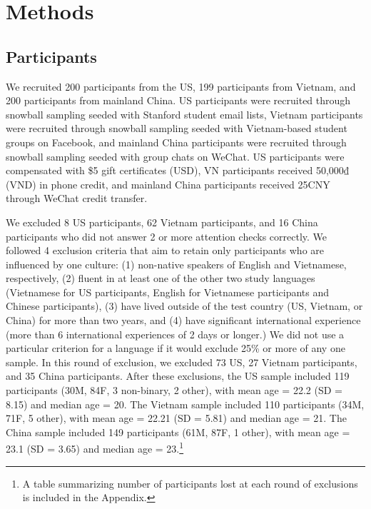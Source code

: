 \documentclass[10pt, letterpaper]{article}
\begin{document}
\hypertarget{methods}{%
\section{Methods}\label{methods}}

\hypertarget{participants}{%
\subsection{Participants}\label{participants}}

We recruited 200 participants from the US, 199 participants from
Vietnam, and 200 participants from mainland China. US participants were
recruited through snowball sampling seeded with Stanford student email
lists, Vietnam participants were recruited through snowball sampling
seeded with Vietnam-based student groups on Facebook, and mainland China
participants were recruited through snowball sampling seeded with group
chats on WeChat. US participants were compensated with \$5 gift
certificates (USD), VN participants received 50,000₫ (VND) in phone
credit, and mainland China participants received 25CNY through WeChat
credit transfer.

We excluded 8 US participants, 62 Vietnam participants, and 16 China
participants who did not answer 2 or more attention checks correctly. We
followed 4 exclusion criteria that aim to retain only participants who
are influenced by one culture: (1) non-native speakers of English and
Vietnamese, respectively, (2) fluent in at least one of the other two
study languages (Vietnamese for US participants, English for Vietnamese
participants and Chinese participants), (3) have lived outside of the
test country (US, Vietnam, or China) for more than two years, and (4)
have significant international experience (more than 6 international
experiences of 2 days or longer.) We did not use a particular criterion
for a language if it would exclude 25\% or more of any one sample. In
this round of exclusion, we excluded 73 US, 27 Vietnam participants, and
35 China participants. After these exclusions, the US sample included
119 participants (30M, 84F, 3 non-binary, 2 other), with mean age = 22.2
(SD = 8.15) and median age = 20. The Vietnam sample included 110
participants (34M, 71F, 5 other), with mean age = 22.21 (SD = 5.81) and
median age = 21. The China sample included 149 participants (61M, 87F, 1
other), with mean age = 23.1 (SD = 3.65) and median age = 23.\footnote{A
  table summarizing number of participants lost at each round of
  exclusions is included in the Appendix.}
\end{document}
